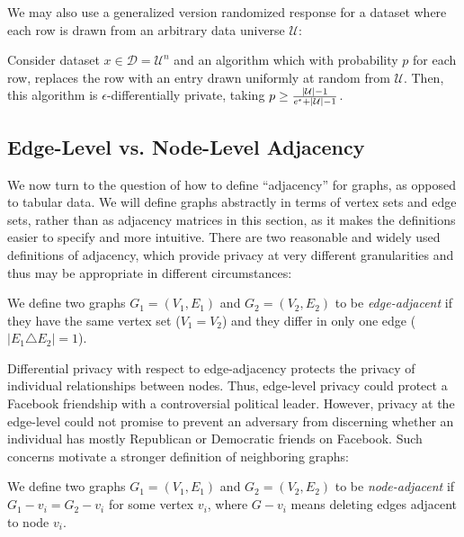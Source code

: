  We may also use a generalized version randomized response for a dataset where each row is drawn from an arbitrary data universe $\mathcal{U}$:

\begin{theorem}
\label{thm:rr_gen} Consider dataset $x \in \mathcal{D} = \mathcal{U}^n$ and an algorithm which with probability $p$ for each row, replaces the row with an entry drawn uniformly at random from $\mathcal{U}$. Then, this algorithm is $\epsilon$-differentially private, taking $p \geq \frac{|\mathcal{U}| - 1}{e^{\epsilon} + |\mathcal{U}| - 1 }$.
\end{theorem}

\subsection{Edge-Level vs. Node-Level Adjacency}

We now turn to the question of how to define ``adjacency'' for graphs, as opposed to tabular data. We will define graphs abstractly in terms of vertex sets and edge sets, rather than as adjacency matrices in this section, as it makes the definitions easier to specify and more intuitive. There are two reasonable and widely used definitions of adjacency, which provide privacy at very different granularities and thus may be appropriate in different circumstances: 

\begin{definition}
\label{def:edge_level}
We define two graphs $G_1 = (V_1, E_1)$ and $G_2 = (V_2, E_2)$ to be \emph{edge-adjacent} if they have the same vertex set ($V_1 = V_2$) and they differ in only one edge ($\left| E_1 \triangle E_2   \right| = 1$). 
\end{definition}
Differential privacy with respect to edge-adjacency protects the privacy of individual relationships between nodes. Thus, edge-level privacy could protect a Facebook friendship with a controversial political leader. However, privacy at the edge-level could not promise to prevent an adversary from discerning whether an individual has mostly Republican or Democratic friends on Facebook. Such concerns motivate a stronger definition of neighboring graphs:

\begin{definition}
\label{def:node_level}
We define two graphs $G_1 = (V_1, E_1)$ and $G_2 = (V_2, E_2)$ to be \emph{node-adjacent} if $G_1-v_i = G_2-v_i$ for some vertex $v_i$, where $G-v_i$ means deleting edges adjacent to node $v_i$.
\end{definition}

